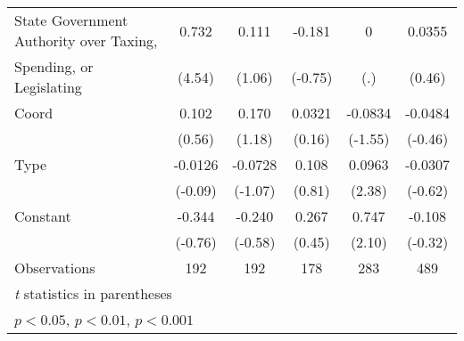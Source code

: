 {\begin{tabular}{l*{5}{c}}
\addlinespace
State Government Authority over Taxing, &0.732\sym{***}&0.111         &-0.181         &    0         &0.0355         \\
Spending, or Legislating                &(4.54)         &(1.06)         &(-0.75)         &  (.)         &(0.46)         \\
\addlinespace
Coord                                   &0.102         &0.170         &0.0321         &-0.0834         &-0.0484         \\
                                        &(0.56)         &(1.18)         &(0.16)         &(-1.55)         &(-0.46)         \\
\addlinespace
Type                                    &-0.0126         &-0.0728         &0.108         &0.0963\sym{*}  &-0.0307         \\
                                        &(-0.09)         &(-1.07)         &(0.81)         &(2.38)         &(-0.62)         \\
\addlinespace
Constant                                &-0.344         &-0.240         &0.267         &0.747\sym{*}  &-0.108         \\
                                        &(-0.76)         &(-0.58)         &(0.45)         &(2.10)         &(-0.32)         \\
\midrule
Observations                            &  192         &  192         &  178         &  283         &  489         \\
\bottomrule
\multicolumn{6}{l}{\footnotesize \textit{t} statistics in parentheses}\\
\multicolumn{6}{l}{\footnotesize \sym{*} \(p<0.05\), \sym{**} \(p<0.01\), \sym{***} \(p<0.001\)}\\
\end{tabular}
}
